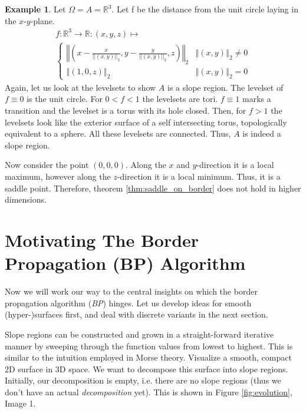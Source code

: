 \documentclass[11pt,twoside,twocolumn,a4paper]{article}
\theoremstyle{plain}
\theoremstyle{definition}
\newtheorem{exmp}[thm]{Example} %
\begin{document}
\begin{exmp}
Let $\Omega = A = \mathbb R^3$.
Let f be the distance from the unit circle laying in the $x$-$y$-plane. 
\begin{multline*}
f: \mathbb R^3 \to \mathbb R: (x,y,z) \mapsto \\
\begin{cases}
\left\Vert\left(x - \frac{x}{||\left(x,y\right)||_2}, y - \frac{y}{||\left(x,y\right)||_2}, z\right)\right\Vert_2 & \left\Vert(x,y)\right\Vert_2 \neq 0 \\
\left\Vert(1, 0, z)\right\Vert_2 & \left\Vert(x,y)\right\Vert_2 = 0
\end{cases}
\end{multline*}
Again, let us look at the levelsets to show $A$ is a slope region.
The levelset of $f \equiv 0$ is the unit circle. For $0 < f < 1$ the levelsets are tori.
$f \equiv 1$ marks a transition and the levelset is a torus with its hole closed.
Then, for $f > 1$ the levelsets look like the exterior surface of a self intersecting torus, topologically equivalent to a sphere.
All these levelsets are connected.
Thus, $A$ is indeed a slope region.

Now consider the point $(0,0,0)$.
Along the $x$ and $y$-direction it is a local maximum, however along the $z$-direction it is a local minimum.
Thus, it is a saddle point.
Therefore, theorem \ref{thm:saddle_on_border} does not hold in higher dimensions.
\end{exmp}


\section{Motivating The Border Propagation (BP) Algorithm}
\label{sec:motivating_BP}

Now we will work our way to the central insights on which the border propagation algorithm (\emph{BP}) hinges.
Let us develop ideas for smooth (hyper-)surfaces first, and deal with discrete variants in the next section.

Slope regions can be constructed and grown in a straight-forward iterative manner by sweeping through the function values from lowest to highest. 
This is similar to the intuition employed in Morse theory\cite{MatsumotoYukio2002AitM}.
Visualize a smooth, compact 2D surface in 3D space.
We want to decompose this surface into slope regions.
Initially, our decomposition is empty, i.e. there are no slope regions (thus we don't have an actual \emph{decomposition} yet).
This is shown in Figure \ref{fig:evolution}, Image 1.
\end{document}

